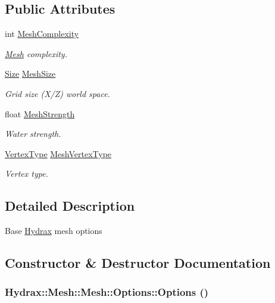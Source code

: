 \subsection*{Public Attributes}
\begin{CompactItemize}
\item 
int \hyperlink{struct_hydrax_1_1_mesh_1_1_options_5d17fbbf820887197a25f00b91ae8812}{MeshComplexity}
\begin{CompactList}\small\item\em \hyperlink{class_hydrax_1_1_mesh}{Mesh} complexity. \item\end{CompactList}\item 
\hyperlink{struct_hydrax_1_1_size}{Size} \hyperlink{struct_hydrax_1_1_mesh_1_1_options_55a90d2808a8604950fc36323dc242c2}{MeshSize}
\begin{CompactList}\small\item\em Grid size (X/Z) world space. \item\end{CompactList}\item 
float \hyperlink{struct_hydrax_1_1_mesh_1_1_options_9b75bf291c99d5041b692c48663859a1}{MeshStrength}
\begin{CompactList}\small\item\em Water strength. \item\end{CompactList}\item 
\hyperlink{class_hydrax_1_1_mesh_5409dc682ec836d1922dc193fc1bf559}{VertexType} \hyperlink{struct_hydrax_1_1_mesh_1_1_options_2593d9978ddbc61ab9f90b78b7f14809}{MeshVertexType}
\begin{CompactList}\small\item\em Vertex type. \item\end{CompactList}\end{CompactItemize}


\subsection{Detailed Description}
Base \hyperlink{class_hydrax_1_1_hydrax}{Hydrax} mesh options 

\subsection{Constructor \& Destructor Documentation}
\hypertarget{struct_hydrax_1_1_mesh_1_1_options_066b70dbf34f7b006350f2fe804ab0f2}{
\subsubsection[{Options}]{\setlength{\rightskip}{0pt plus 5cm}Hydrax::Mesh::Mesh::Options::Options ()}}
\label{struct_hydrax_1_1_mesh_1_1_options_066b70dbf34f7b006350f2fe804ab0f2}


